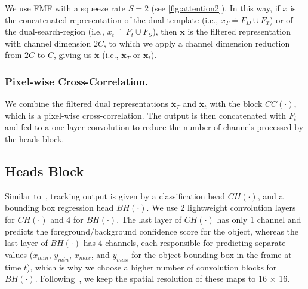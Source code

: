We use FMF with a squeeze rate $S=2$ (see \ref{fig:attention2}). In this way, if $x$ is the concatenated representation of the dual-template (i.e., $x_T \doteq F_D \cup F_T$) or of the dual-search-region (i.e., $x_t \doteq F_t \cup F_S$), then $\boldsymbol{x}$ is the filtered representation with channel dimension $2C$, to which we apply a channel dimension reduction from $2C$ to $C$, giving us $\boldsymbol{\check{x}}$ (i.e., $\boldsymbol{\check{x}}_T$ or $\boldsymbol{\check{x}}_t$).

\subsubsection{Pixel-wise Cross-Correlation.}
We combine the filtered dual representations $\boldsymbol{\check{x}}_T$ and $\boldsymbol{\check{x}}_t$ with the block $CC(\cdot)$, which is a pixel-wise cross-correlation. The output is then concatenated with $F_t$ and fed to a one-layer convolution to reduce the number of channels processed by the heads block.

\subsection{Heads Block}
Similar to~\cite{zhang2020ocean, borsuk2022fear}, tracking output is given by a classification head $CH(\cdot)$, and a bounding box regression head $BH(\cdot)$.
We use 2 lightweight convolution layers for $CH(\cdot)$ and 4 for $BH(\cdot)$.
The last layer of $CH(\cdot)$ has only 1 channel and predicts the foreground/background confidence score for the object, whereas the last layer of $BH(\cdot)$ has 4 channels, each responsible for predicting separate values ($x_{min}$, $y_{min}$, $x_{max}$, and $y_{max}$ for the object bounding box in the frame at time $t$), which is why we choose a higher number of convolution blocks for $BH(\cdot)$. Following~\cite{borsuk2022fear}, we keep the spatial resolution of these maps to 16 $\times$ 16. 

